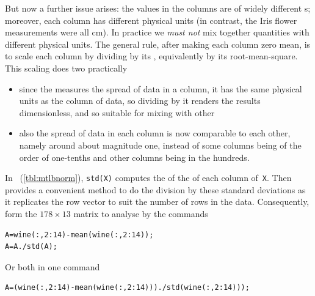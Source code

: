 \begin{example}
\begin{solution}
\begin{enumerate}
But now a further issue arises: the values in the columns are of widely different s; moreover, each column has different physical units (in contrast, the Iris flower measurements were all cm).
In practice we \emph{must not} mix together quantities with different physical units. 
The general rule, after making each column zero mean, is to scale each column by dividing by its , equivalently by its root-mean-square.
This scaling does two practically 
\begin{itemize}
\item since the  measures the spread of data in a column, it has the same physical units as the column of data, so dividing by it renders the results dimensionless, and so suitable for mixing with other 
\item also the spread of data in each column is now comparable to each other, namely around about magnitude one, instead of some columns being of the order of one-tenths and other columns being in the hundreds.
\end{itemize}
In \script\ (\cref{tbl:mtlbnorm}), \verb|std(X)| computes the  of the  of each column of~\verb|X|.
Then   provides a convenient method to do the division by these standard deviations as it replicates the row vector to suit the number of rows in the data.
Consequently, form the \(178\times13\) matrix to analyse by the commands
\begin{verbatim}
A=wine(:,2:14)-mean(wine(:,2:14));
A=A./std(A);
\end{verbatim}
Or both in one command
\begin{verbatim}
A=(wine(:,2:14)-mean(wine(:,2:14)))./std(wine(:,2:14)));
\end{verbatim}


\end{enumerate}
\end{solution}
\end{example}
